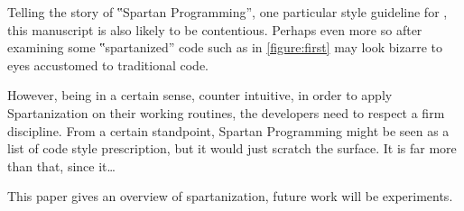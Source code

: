 Telling the story of ‟Spartan Programming”, one particular style guideline for
\Java, this manuscript is also likely to be contentious. Perhaps even more so
after examining some ‟spartanized” code such as in \cref{figure:first}
may look bizarre to eyes accustomed to traditional \Java code.


However, being in a certain sense, counter intuitive, in order to apply
Spartanization on their working routines, the developers need to respect a
firm discipline. From a certain standpoint, Spartan Programming might be
seen as a list of code style prescription, but it would just scratch the
surface. It is far more than that, since it…  

This paper gives an overview of spartanization, future work will be
experiments.
